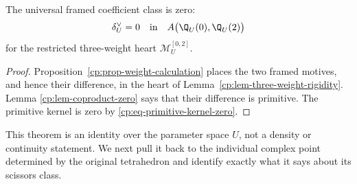 \begin{theorem}
\label{cp:thm-relative-defect-zero}
The universal framed coefficient class is zero:
\[
 \delta_U^\vee=0
 \quad\text{in}\quad
 A\bigl(\Q_U(0),\Q_U(2)\bigr)
\]
for the restricted three-weight heart \(\mathcal M_U^{[0,2]}\).
\end{theorem}

\begin{proof}
Proposition~\ref{cp:prop-weight-calculation} places the two framed motives,
and hence their difference, in the heart of
Lemma~\ref{cp:lem-three-weight-rigidity}.  Lemma
\ref{cp:lem-coproduct-zero} says that their difference is primitive.  The
primitive kernel is zero by \eqref{cp:eq-primitive-kernel-zero}.
\end{proof}

This theorem is an identity over the parameter space \(U\), not a density
or continuity statement.  We next pull it back to the individual complex
point determined by the original tetrahedron and identify exactly what it
says about its scissors class.

